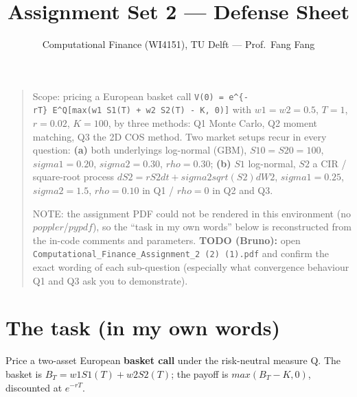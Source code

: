 \documentclass[
  11pt,
]{article}
\title{Assignment Set 2 --- Defense Sheet}
\author{Computational Finance (WI4151), TU Delft --- Prof.~Fang Fang}
\date{}
\begin{document}
\maketitle

{
\hypersetup{linkcolor=blue}
\setcounter{tocdepth}{3}
\tableofcontents
}
\begin{quote}
Scope: pricing a European basket call
\texttt{V(0)\ =\ e\^{}\{-rT\}\ E\^{}Q{[}max(w1\ S1(T)\ +\ w2\ S2(T)\ -\ K,\ 0){]}}
with \(w1 = w2 = 0.5\), \(T = 1\), \(r = 0.02\), \(K = 100\), by three
methods: Q1 Monte Carlo, Q2 moment matching, Q3 the 2D COS method. Two
market setups recur in every question: \textbf{(a)} both underlyings
log-normal (GBM), \(S10=S20=100\), \(sigma1=0.20\), \(sigma2=0.30\),
\(rho=0.30\); \textbf{(b)} \(S1\) log-normal, \(S2\) a CIR / square-root
process \(dS2 = r S2 dt + sigma2 sqrt(S2) dW2\), \(sigma1=0.25\),
\(sigma2=1.5\), \(rho=0.10\) in Q1 / \(rho=0\) in Q2 and Q3.

NOTE: the assignment PDF could not be rendered in this environment (no
\(poppler\)/\(pypdf\)), so the ``task in my own words'' below is
reconstructed from the in-code comments and parameters. \textbf{TODO
(Bruno):} open
\texttt{Computational\_Finance\_Assignment\_2\ (2)\ (1).pdf} and confirm
the exact wording of each sub-question (especially what convergence
behaviour Q1 and Q3 ask you to demonstrate).
\end{quote}

\hypertarget{the-task-in-my-own-words}{%
\section{The task (in my own words)}\label{the-task-in-my-own-words}}

Price a two-asset European \textbf{basket call} under the risk-neutral
measure Q. The basket is \(B_T = w1 S1(T) + w2 S2(T)\); the payoff is
\(max(B_T - K, 0)\), discounted at \(e^{-rT}\).
\end{document}
